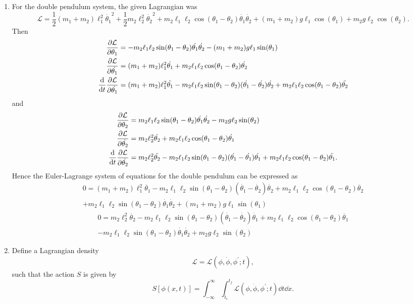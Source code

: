\documentclass[11pt]{article}
\begin{document}
\begin{enumerate}
    \item For the double pendulum system, the given Lagrangian was \[\mathcal{L} = \frac{1}{2}(m_1+m_2)\ell_1^2\dot{\theta_1}^2 + \frac{1}{2}m_2\ell_2^2\dot{\theta_2}^2 + m_2\ell_1\ell_2\cos(\theta_1-\theta_2)\dot{\theta_1}\dot{\theta_2} + (m_1+m_2)g\ell_1\cos(\theta_1) + m_2g\ell_2\cos(\theta_2).\] Then \begin{align*}
        \pdv{\mathcal{L}}{\theta_1} &= -m_2\ell_1\ell_2\sin(\theta_1-\theta_2)\dot{\theta_1}\dot{\theta_2} - (m_1+m_2)g\ell_1\sin(\theta_1)\\
        \pdv{\mathcal{L}}{\dot{\theta_1}} &= (m_1+m_2)\ell_1^2\dot{\theta_1} + m_2\ell_1\ell_2\cos(\theta_1-\theta_2)\dot{\theta_2}\\
        \dv{t}\pdv{\mathcal{L}}{\dot{\theta_1}} &= (m_1+m_2)\ell_1^2\ddot{\theta_1} - m_2\ell_1\ell_2\sin(\theta_1-\theta_2)(\dot{\theta_1}-\dot{\theta_2})\dot{\theta_2} + m_2\ell_1\ell_2\cos(\theta_1-\theta_2)\ddot{\theta_2}
    \end{align*} and \begin{align*}
        \pdv{\mathcal{L}}{\theta_2} &= m_2\ell_1\ell_2\sin(\theta_1-\theta_2)\dot{\theta_1}\dot{\theta_2} - m_2g\ell_2\sin(\theta_2)\\
        \pdv{\mathcal{L}}{\dot{\theta_2}} &= m_2\ell_2^2\dot{\theta_2} + m_2\ell_1\ell_2\cos(\theta_1-\theta_2)\dot{\theta_1}\\
        \dv{t}\pdv{\mathcal{L}}{\dot{\theta_2}} &= m_2\ell_2^2\ddot{\theta_2} - m_2\ell_1\ell_2\sin(\theta_1-\theta_2)(\dot{\theta_1}-\dot{\theta_1})\dot{\theta_1} + m_2\ell_1\ell_2\cos(\theta_1-\theta_2)\ddot{\theta_1}.
    \end{align*}
    Hence the Euler-Lagrange system of equations for the double pendulum can be expressed as \begin{multline*}
        0 = (m_1+m_2)\ell_1^2\ddot{\theta_1} - m_2\ell_1\ell_2\sin(\theta_1-\theta_2)(\dot{\theta_1}-\dot{\theta_2})\dot{\theta_2} + m_2\ell_1\ell_2\cos(\theta_1-\theta_2)\ddot{\theta_2}\\ + m_2\ell_1\ell_2\sin(\theta_1-\theta_2)\dot{\theta_1}\dot{\theta_2} + (m_1+m_2)g\ell_1\sin(\theta_1)
    \end{multline*} \begin{multline*}
        0 = m_2\ell_2^2\ddot{\theta_2} - m_2\ell_1\ell_2\sin(\theta_1-\theta_2)(\dot{\theta_1}-\dot{\theta_2})\dot{\theta_1} + m_2\ell_1\ell_2\cos(\theta_1-\theta_2)\ddot{\theta_1}\\ -m_2\ell_1\ell_2\sin(\theta_1-\theta_2)\dot{\theta_1}\dot{\theta_2} + m_2g\ell_2\sin(\theta_2)
    \end{multline*}
    \item Define a Lagrangian density \[\mathcal{L} = \mathcal{L}(\phi, \dot{\phi}, \phi^{\prime}; t),\] such that the action $S$ is given by \[S[\phi(x,t)] = \int_{-\infty}^{\infty}\int_{t_i}^{t_f} \mathcal{L}(\phi, \dot{\phi}, \phi^{\prime}; t)\dd{t}\dd{x} .\]
    

\end{enumerate}
\end{document}
